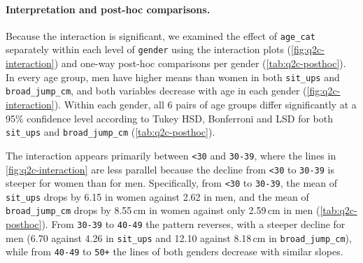 \paragraph{Interpretation and post-hoc comparisons.}
Because the interaction is significant, we examined the effect of \texttt{age\_cat} separately within each level of \texttt{gender} using the interaction plots (\autoref{fig:q2c-interaction}) and one-way post-hoc comparisons per gender (\autoref{tab:q2c-posthoc}).
In every age group, men have higher means than women in both \texttt{sit\_ups} and \texttt{broad\_jump\_cm}, and both variables decrease with age in each gender (\autoref{fig:q2c-interaction}).
Within each gender, all 6 pairs of age groups differ significantly at a 95\% confidence level according to Tukey HSD, Bonferroni and LSD for both \texttt{sit\_ups} and \texttt{broad\_jump\_cm} (\autoref{tab:q2c-posthoc}).

The interaction appears primarily between \texttt{<30} and \texttt{30-39}, where the lines in \autoref{fig:q2c-interaction} are less parallel because the decline from \texttt{<30} to \texttt{30-39} is steeper for women than for men.
Specifically, from \texttt{<30} to \texttt{30-39}, the mean of \texttt{sit\_ups} drops by 6.15 in women against 2.62 in men, and the mean of \texttt{broad\_jump\_cm} drops by 8.55\,cm in women against only 2.59\,cm in men (\autoref{tab:q2c-posthoc}).
From \texttt{30-39} to \texttt{40-49} the pattern reverses, with a steeper decline for men (6.70 against 4.26 in \texttt{sit\_ups} and 12.10 against 8.18\,cm in \texttt{broad\_jump\_cm}), while from \texttt{40-49} to \texttt{50+} the lines of both genders decrease with similar slopes.
